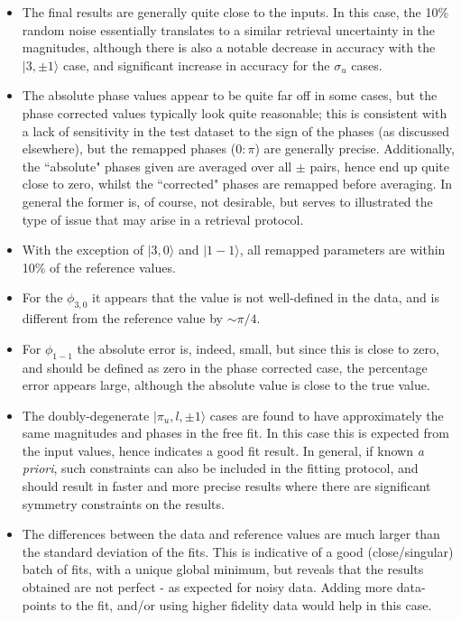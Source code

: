 \documentclass[10pt]{article}
\begin{document}
\begin{itemize}
\item The final results are generally quite close to the inputs. In this case, the 10\% random noise essentially translates to a similar retrieval uncertainty in the magnitudes, although there is also a notable decrease in accuracy with the $|3,\pm1\rangle$ case, and significant increase in accuracy for the $\sigma_u$ cases.
\item The absolute phase values appear to be quite far off in some cases, but the phase corrected values typically look quite reasonable; this is consistent with a lack of sensitivity in the test dataset to the sign of the phases (as discussed elsewhere), but the remapped phases ($0:\pi$) are generally precise. Additionally, the ``absolute" phases given are averaged over all $\pm$ pairs, hence end up quite close to zero, whilst the ``corrected" phases are remapped before averaging. In general the former is, of course, not desirable, but serves to illustrated the type of issue that may arise in a retrieval protocol.
\item With the exception of $|3,0\rangle$ and $|1-1\rangle$, all remapped parameters are within 10\% of the reference values.
\item For the $\phi_{3,0}$ it appears that the value is not well-defined in the data, and is different from the reference value by $\sim\pi/4$.
\item For $\phi_{1-1}$ the absolute error is, indeed, small, but since this is close to zero, and should be defined as zero in the phase corrected case, the percentage error appears large, although the absolute value is close to the true value.
\item The doubly-degenerate $|\pi_u,l,\pm1\rangle$ cases are found to have approximately the same magnitudes and phases in the free fit. In this case this is expected from the input values, hence indicates a good fit result. In general, if known \textit{a priori}, such constraints can also be included in the fitting protocol, and should result in faster and more precise results where there are significant symmetry constraints on the results.
\item The differences between the data and reference values are much larger than the standard deviation of the fits. This is indicative of a good (close/singular) batch of fits, with a unique global minimum, but reveals that the results obtained are not perfect - as expected for noisy data. Adding more data-points to the fit, and/or using higher fidelity data would help in this case.

\end{itemize}
\end{document}
